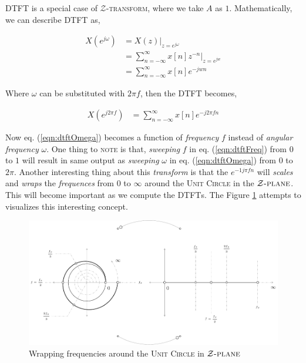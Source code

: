\documentclass[../../course]{subfiles}
\begin{document}
\textsc{DTFT} is a special case of $\mathcal{Z}$\textsc{-transform}, where we take $A$
as $1$. Mathematically, we can describe \textsc{DTFT} as,

\begin{align}
    X(e^{j \omega}) &= X(z) |_{z = e^{j \omega}} \\
    &= \sum_{n = - \infty}^{\infty} x[n] z^{-n} \Big|_{z = e^{jw}} \\
    &= \sum_{n = - \infty}^{\infty} x[n] e^{-j w n} \label{eqn:dtftOmega}
\end{align}

Where $\omega$ can be substituted with $2 \pi f$, then the \textsc{DTFT} becomes,

\begin{align}
    X(e^{j 2 \pi f}) &= \sum_{n = - \infty}^{\infty} x[n] e^{-j 2 \pi f n}
    \label{eqn:dtftFreq}
\end{align}

Now eq. (\ref{eqn:dtftOmega}) becomes a function of \emph{frequency} $f$
instead of \emph{angular frequency} $\omega$. One thing to \textsc{note} is that,
\emph{sweeping} $f$ in eq. (\ref{eqn:dtftFreq}) from $0$ to $1$ will result in same
output as \emph{sweeping} $\omega$ in eq. (\ref{eqn:dtftOmega}) from $0$ to $2 \pi$.
Another interesting thing about this \emph{transform} is that the $e^{-1j \pi f n}$ will
\emph{scales} and \emph{wraps} the \emph{frequences} from $0$ to $\infty$ around
the \textsc{Unit Circle} in the $\mathcal{Z} \textsc{-plane}$. This will become
important as we compute the \textsc{DTFT}s. The Figure \ref{fig:wrapFreqUnitCircle}
attempts to visualizes this interesting concept.

\begin{figure}
    \centering
     {
        \includegraphics[height = 1\textheight] {tikzpics/epicWrapFreqUnitCircle.pdf}
    }
     {
        Wrapping frequencies around the \textsc{Unit Circle} in $\mathcal{Z}\textsc{-plane}$
    }
    \label{fig:wrapFreqUnitCircle}
\end{figure}
\end{document}

